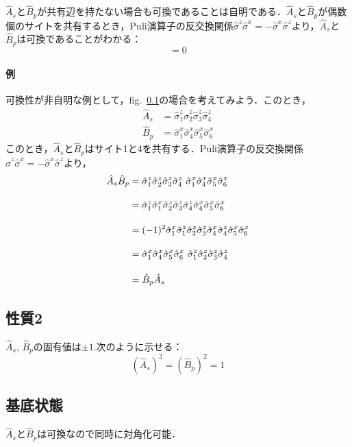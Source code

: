 \documentclass[dvipdfmx,autodetect-engine]{jsarticle}
\newcommand{\nn}{\notag \\}
\begin{document}
$\hat{A}_s$と$\hat{B}_p$が共有辺を持たない場合も可換であることは自明である．$\hat{A}_s$と$\hat{B}_p$が偶数個のサイトを共有するとき，Puli演算子の反交換関係$\hat{\sigma}^{z}\hat{\sigma}^{x}=-\hat{\sigma}^{x}\hat{\sigma}^{z}$より，$\hat{A}_s$と$\hat{B}_p$は可換であることがわかる：
\begin{equation}
    [\hat{A}_s,\ \hat{B}_p] = 0
\end{equation}
\paragraph{例}
可換性が非自明な例として，fig.~\ref{}の場合を考えてみよう．このとき，
\begin{align}
     \hat{A}_s 
     &= \hat{\sigma}^{z}_1\hat{\sigma}^{z}_2\hat{\sigma}^{z}_3\hat{\sigma}^{z}_4\\[10pt]
    \hat{B}_p
    &= \hat{\sigma}^{x}_1\hat{\sigma}^{x}_4\hat{\sigma}^{x}_5\hat{\sigma}^{x}_6
\end{align}
このとき，$\hat{A}_s$と$\hat{B}_p$はサイト1と4を共有する．Puli演算子の反交換関係$\hat{\sigma}^{z}\hat{\sigma}^{x}=-\hat{\sigma}^{x}\hat{\sigma}^{z}$より，
\begin{align}
     \hat{A}_s \hat{B}_p
     &= \hat{\sigma}^{z}_1\hat{\sigma}^{z}_2\hat{\sigma}^{z}_3\hat{\sigma}^{z}_4\ 
     \hat{\sigma}^{x}_1\hat{\sigma}^{x}_4\hat{\sigma}^{x}_5\hat{\sigma}^{x}_6\nn[10pt]
     &= \hat{\sigma}^{z}_1\hat{\sigma}^{x}_1
     \hat{\sigma}^{z}_2\hat{\sigma}^{z}_3\hat{\sigma}^{z}_4\hat{\sigma}^{x}_4
     \hat{\sigma}^{x}_5\hat{\sigma}^{x}_6\nn[10pt]
     &= (-1)^2\hat{\sigma}^{x}_1\hat{\sigma}^{z}_1
     \hat{\sigma}^{z}_2\hat{\sigma}^{z}_3
     \hat{\sigma}^{x}_4\hat{\sigma}^{z}_4
     \hat{\sigma}^{x}_5\hat{\sigma}^{x}_6\nn[10pt]
     &=\hat{\sigma}^{x}_1\hat{\sigma}^{x}_4
     \hat{\sigma}^{x}_5\hat{\sigma}^{x}_6\ 
     \hat{\sigma}^{z}_1
     \hat{\sigma}^{z}_2\hat{\sigma}^{z}_3
     \hat{\sigma}^{z}_4
     \nn[10pt]
     &=\hat{B}_p \hat{A}_s 
\end{align}

\subsection*{性質2}$\hat{A}_s$, $\hat{B}_p$の固有値は$\pm1$.次のように示せる：
\begin{equation}
    (\hat{A}_s)^2 = (\hat{B}_p)^2 = 1
\end{equation}


\subsection{基底状態}
$\hat{A}_s$と$\hat{B}_p$は可換なので同時に対角化可能．
\end{document}
